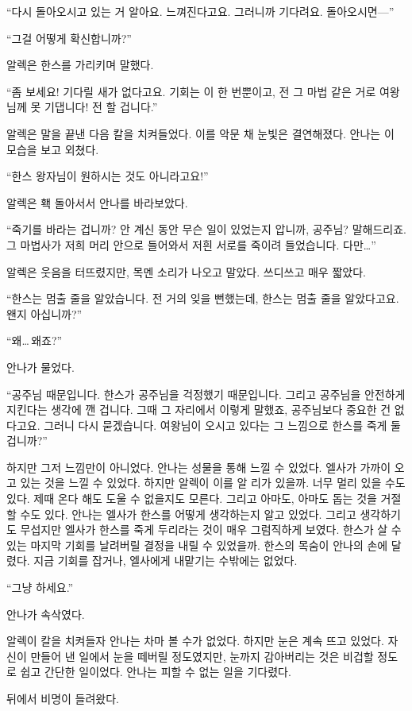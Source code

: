 ``다시 돌아오시고 있는 거 알아요. 느껴진다고요. 그러니까 기다려요. 돌아오시면—''

``그걸 어떻게 확신합니까?''

알렉은 한스를 가리키며 말했다.

``좀 보세요! 기다릴 새가 없다고요. 기회는 이 한 번뿐이고, 전 그 마법 같은 거로 여왕님께 못 기댑니다! 전 할 겁니다.''

알렉은 말을 끝낸 다음 칼을 치켜들었다. 이를 악문 채 눈빛은 결연해졌다. 안나는 이 모습을 보고 외쳤다.

``한스 왕자님이 원하시는 것도 아니라고요!''

알렉은 홱 돌아서서 안나를 바라보았다.

``죽기를 바라는 겁니까? 안 계신 동안 무슨 일이 있었는지 압니까, 공주님? 말해드리죠. 그 마법사가 저희 머리 안으로 들어와서 저흰 서로를 죽이려 들었습니다. 다만\ldots''

알렉은 웃음을 터뜨렸지만, 목멘 소리가 나오고 말았다. 쓰디쓰고 매우 짧았다.

``한스는 멈출 줄을 알았습니다. 전 거의 잊을 뻔했는데, 한스는 멈출 줄을 알았다고요. 왠지 아십니까?''

``왜\ldots\,왜죠?''

안나가 물었다.

``공주님 때문입니다. 한스가 공주님을 걱정했기 때문입니다. 그리고 공주님을 안전하게 지킨다는 생각에 깬 겁니다. 그때 그 자리에서 이렇게 말했죠, 공주님보다 중요한 건 없다고요. 그러니 다시 묻겠습니다. 여왕님이 오시고 있다는 그 느낌으로 한스를 죽게 둘 겁니까?''

하지만 그저 느낌만이 아니었다. 안나는 성물을 통해 느낄 수 있었다. 엘사가 가까이 오고 있는 것을 느낄 수 있었다. 하지만 알렉이 이를 알 리가 있을까. 너무 멀리 있을 수도 있다. 제때 온다 해도 도울 수 없을지도 모른다. 그리고 아마도, 아마도 돕는 것을 거절할 수도 있다. 안나는 엘사가 한스를 어떻게 생각하는지 알고 있었다. 그리고 생각하기도 무섭지만 엘사가 한스를 죽게 두리라는 것이 매우 그럼직하게 보였다. 한스가 살 수 있는 마지막 기회를 날려버릴 결정을 내릴 수 있었을까. 한스의 목숨이 안나의 손에 달렸다. 지금 기회를 잡거나, 엘사에게 내맡기는 수밖에는 없었다.

``그냥 하세요.''

안나가 속삭였다.

알렉이 칼을 치켜들자 안나는 차마 볼 수가 없었다. 하지만 눈은 계속 뜨고 있었다. 자신이 만들어 낸 일에서 눈을 떼버릴 정도였지만, 눈까지 감아버리는 것은 비겁할 정도로 쉽고 간단한 일이었다. 안나는 피할 수 없는 일을 기다렸다.

뒤에서 비명이 들려왔다.

